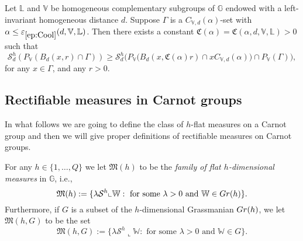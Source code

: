 \documentclass[10pt, a4paper,
oneside, headinclude,footinclude]{scrartcl}
\begin{document}
\begin{lemma}\label{lemma:lowerbd}
Let $\mathbb{L}$ and $\mathbb{V}$ be homogeneous complementary subgroups of $\mathbb G$ endowed with a left-invariant homogeneous distance $d$. Suppose $\Gamma$ is a $C_{\mathbb V,d}(\alpha)$-set with $\alpha\leq\oldep{ep:Cool}(d,\mathbb V,\mathbb L)$. Then there exists a constant $\mathfrak{C}(\alpha)=\mathfrak{C}(\alpha,d,\mathbb V,\mathbb L)>0$ such that
$$\mathcal{S}^h_d(P_\mathbb{V}(B_d(x,r)\cap \Gamma))\geq \mathcal{S}^h_d\Big(P_\mathbb{V}\big(B_d(x,\mathfrak{C}(\alpha)r)\cap xC_{\mathbb{V},d}(\alpha)\big)\cap P_\mathbb{V}(\Gamma)\Big),$$
for any $x\in\Gamma$, and any $r>0$.
\end{lemma}



\subsection{Rectifiable measures in Carnot groups}
In what follows we are going to define the class of $h$-flat measures on a Carnot group and then we will give proper definitions of rectifiable measures on Carnot groups. 

\begin{definizione}
For any $h\in\{1,\ldots,Q\}$ we let $\mathfrak{M}(h)$ to be the {\em family of flat $h$-dimensional measures} in $\mathbb{G}$, i.e.,
$$\mathfrak{M}(h):=\{\lambda\mathcal{S}^h\llcorner \mathbb W:\text{ for some }\lambda> 0 \text{ and }\mathbb W\in Gr(h)\}.$$ 
Furthermore, if $G$ is a subset of the $h$-dimensional Grassmanian $Gr(h)$, we let $\mathfrak{M}(h,G)$ to be the set \begin{equation}
    \mathfrak{M}(h,G):=\{\lambda\mathcal{S}^h\llcorner \mathbb{W}:\text{ for some }\lambda> 0\text{ and }\mathbb{W}\in G\}.
    \label{Gotico(h)}
\end{equation}
\end{definizione}
\end{document}
